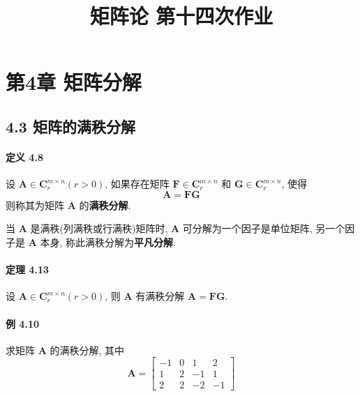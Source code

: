 \documentclass[12pt, a4paper, oneside, fontset=none]{ctexart}
\author{}
\date{}
\title{\vspace{-3em}\textbf{矩阵论 \quad 第十四次作业}\vspace{-3em}}
\begin{document}
\maketitle

\section*{第4章 \quad 矩阵分解}

\subsection*{4.3 \quad 矩阵的满秩分解}

\paragraph*{定义 4.8} 设 $\bm{A} \in \bm{C}^{m\times n}_r (r > 0)$, 如果存在矩阵 $\bm{F} \in \bm{C}^{m\times n}_r$ 和 $\bm{G} \in \bm{C}^{m\times n}_r$, 使得
$$
    \bm{A} = \bm{FG}
$$
则称其为矩阵 $\bm{A}$ 的\textbf{满秩分解}.
\par 当 $\bm{A}$ 是满秩(列满秩或行满秩)矩阵时, $\bm{A}$ 可分解为一个因子是单位矩阵, 另一个因子是 $\bm{A}$
本身, 称此满秩分解为\textbf{平凡分解}.

\paragraph*{定理 4.13} 设 $\bm{A} \in \bm{C}^{m\times n}_r(r > 0)$, 则 $\bm{A}$ 有满秩分解 $\bm{A} = \bm{FG}$.

\paragraph*{例 4.10} 求矩阵 $\bm{A}$ 的满秩分解, 其中
$$
    \bm{A} = \begin{bmatrix}
        -1 & 0 & 1  & 2  \\
        1  & 2 & -1 & 1  \\
        2  & 2 & -2 & -1
    \end{bmatrix}
$$
\end{document}
